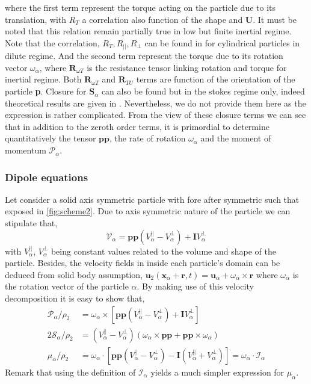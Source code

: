 where the first term represent the torque acting on the particle due to its translation,
with $R_T$ a correlation also function of the shape and $\textbf{U}$.
It must be noted that this relation remain partially true in low but finite inertial regime. 
Note that the correlation,  $R_T, R_{||} , R_{\bot}$ can be found in \citet{fintzi2023inertial} for cylindrical particles in dilute regime. 
And the second term represent the torque due to its rotation vector $\omega_\alpha$, where $\textbf{R}_{\omega T}$ is the resistance tensor linking rotation and torque \citet{pierson2021hydrodynamic} for inertial regime.  
Both $\textbf{R}_{\omega T}$ and $\textbf{R}_{TU}$ terms are function of the orientation of the particle \textbf{p}.
Closure for $\textbf{S}_\alpha$ can also be found but in the stokes regime only, 
indeed theoretical results are given in \citet[p 62]{kim2013microhydrodynamics}. Nevertheless, we do not provide them here as the expression is rather complicated. 
From the view of these closure terms we can see that in addition to the zeroth order terms, it is primordial to determine quantitatively the tensor $\textbf{pp}$, the rate of rotation $\omega_\alpha$ and the moment of momentum $\mathcal{P}_\alpha$. 

\subsubsection*{Dipole equations}
Let consider a solid axis symmetric particle with fore after symmetric such that exposed in \ref{fig:scheme2}. 
Due to axis symmetric nature of the particle we can stipulate that, 
\begin{equation}
    \mathcal{V}_\alpha =  \textbf{pp} (V_\alpha^{||} - V_\alpha^\bot) 
    +  \textbf{I} V_\alpha^\bot
    \label{eq:V_definition}
\end{equation}
with $V_\alpha^{||}$, $V_\alpha^\bot$ being constant values related to the volume and shape of the particle. 
Besides, the velocity fields in inside each particle's domain can be deduced from solid body assumption, $\textbf{u}_2(\textbf{x}_\alpha + \textbf{r},t) = \textbf{u}_\alpha + \omega_\alpha \times \textbf{r}$ where $\omega_\alpha$ is the rotation vector of the particle $\alpha$.
By making use of this velocity decomposition it is easy to show that,
\begin{align}
    \mathcal{P}_\alpha/\rho_2
    &=  \omega_\alpha \times \left[
        \textbf{pp}(V_\alpha^{||} - V_\alpha^\bot) 
        + \textbf{I} V_\alpha^\bot
    \right]
    \label{eq:P_edfinition}\\
    2\mathcal{S}_\alpha/\rho_2
    &=  (V_\alpha^{||} - V_\alpha^\bot) \left(
        \omega_\alpha \times
        \textbf{pp}
        + \textbf{pp} \times \omega_\alpha
    \right)
    \label{eq:S_definition}\\
    \mu_\alpha / \rho_2
    &= \omega_\alpha \cdot \left[
        \textbf{pp} 
    (V_\alpha^{||}  - V_\alpha^{\bot} ) 
    - \textbf{I}(V_\alpha^{||} + V_\alpha^{\bot})
    \right]
    = \omega_\alpha \cdot\mathcal{I}_\alpha
    \label{eq:mu_definition}
\end{align}
Remark that  using the definition of $\mathcal{I}_\alpha$ yields a much simpler expression for $\mu_\alpha$. 

